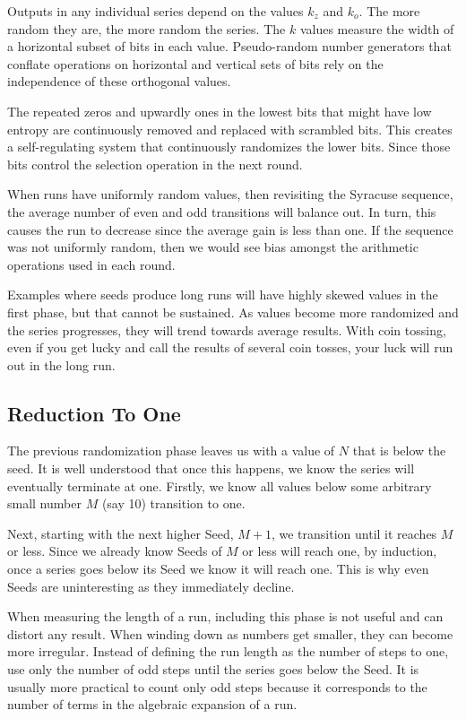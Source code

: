 \documentclass[preprint]{sigplanconf}
\begin{document}
Outputs in any individual series depend on the values $k_z$ and $k_o$. The more random they are, the more random the series. The $k$ values measure the width of a horizontal subset of bits in each value. Pseudo-random number generators that conflate operations on horizontal and vertical sets of bits rely on the independence of these orthogonal values.

The repeated zeros and upwardly ones in the lowest bits that might have low entropy are continuously removed and replaced with scrambled bits. This creates a self-regulating system that continuously randomizes the lower bits. Since those bits control the selection operation in the next round.

When runs have uniformly random values, then revisiting the Syracuse sequence, the average number of even and odd transitions will balance out. In turn, this causes the run to decrease since the average gain is less than one. If the sequence was not uniformly random, then we would see bias amongst the arithmetic operations used in each round.

Examples where seeds produce long runs will have highly skewed values in the first phase, but that cannot be sustained. As values become more randomized and the series progresses, they will trend towards average results. With coin tossing, even if you get lucky and call the results of several coin tosses, your luck will run out in the long run.

\subsection{Reduction To One}

The previous randomization phase leaves us with a value of \( N \) that is below the seed. It is well understood that once this happens, we know the series will eventually terminate at one. Firstly, we know all values below some arbitrary small number \( M \) (say 10) transition to one.

Next, starting with the next higher Seed, \( M + 1 \), we transition until it reaches \( M \) or less. Since we already know Seeds of \( M \) or less will reach one, by induction, once a series goes below its Seed we know it will reach one. This is why even Seeds are uninteresting as they immediately decline.

When measuring the length of a run, including this phase is not useful and can distort any result. When winding down as numbers get smaller, they can become more irregular. Instead of defining the run length as the number of steps to one, use only the number of odd steps until the series goes below the Seed. It is usually more practical to count only odd steps because it corresponds to the number of terms in the algebraic expansion of a run.
\end{document}
